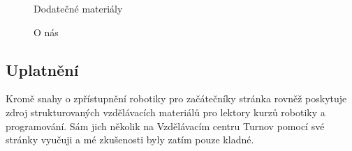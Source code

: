 \documentclass[a4paper, 12pt, twoside]{article}
\begin{document}
  \begin{figure}[H]
      \caption{Dodatečné materiály} \label{img:Dodatečné materiály}
    \endminipage\hfill
      \caption{O nás} \label{img:O nás}
    \endminipage
  \end{figure}


  \subsection{Uplatnění}
  Kromě snahy o zpřístupnění robotiky pro začátečníky stránka rovněž poskytuje zdroj strukturovaných vzdělávacích materiálů pro lektory kurzů robotiky a programování. Sám jich několik na Vzdělávacím centru Turnov pomocí své stránky vyučuji a mé zkušenosti byly zatím pouze kladné.
\end{document}
